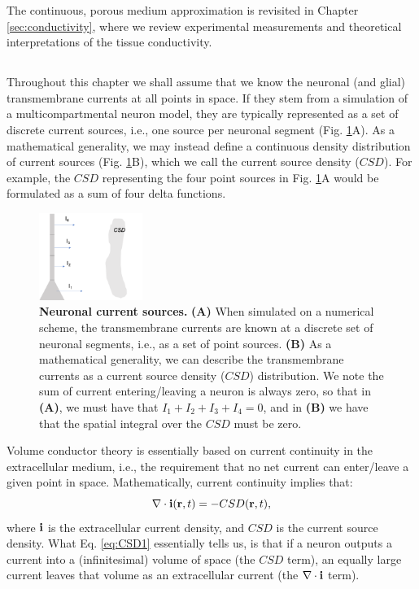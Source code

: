 The continuous, porous medium approximation is revisited in Chapter \ref{sec:conductivity}, where we review experimental measurements and theoretical interpretations of the tissue conductivity.


\subsection{}
\label{sec:continuous}
Throughout this chapter we shall assume that we know the neuronal (and glial) transmembrane currents at all points in space. If they stem from a simulation of a multicompartmental neuron model, they are typically represented as a set of discrete current sources, i.e., one source per neuronal segment (Fig. \ref{VC:fig:CSD}A). As a mathematical generality, we may instead define a continuous density distribution of current sources (Fig. \ref{VC:fig:CSD}B), which we call the current source density ($CSD$). For example, the $CSD$ representing the four point sources in Fig. \ref{VC:fig:CSD}A would be formulated as a sum of four delta functions. 

\begin{figure}[!ht]
\begin{center}
\includegraphics[width=0.3\textwidth]{Figures/VC/CSD.png}
\end{center}
\caption{\textbf{Neuronal current sources.}  {\bf (A)} When simulated on a numerical scheme, the transmembrane currents are known at a discrete set of neuronal segments, i.e., as a set of point sources.  {\bf (B)} As a mathematical generality, we can describe the transmembrane currents as a current source density ($CSD$) distribution. We note the sum of current entering/leaving a neuron is always zero, so that in {\bf (A)}, we must have that $I_1 + I_2 + I_3 + I_4 = 0$, and in {\bf (B)} we have that the spatial integral over the $CSD$ must be zero.
}
\label{VC:fig:CSD}
\end{figure}
Volume conductor theory is essentially based on current continuity in the extracellular medium, i.e., the requirement that no net current can enter/leave a given point in space. Mathematically, current continuity implies that:
\begin{equation}
\nabla \cdot {\bf i}({\bf r}, t) = - CSD({\bf r}, t),
\label{eq:CSD1}
\end{equation}
where ${\bf i}$ is the extracellular current density, and $CSD$ is the current source density. What Eq. \ref{eq:CSD1} essentially tells us, is that if a neuron outputs a current into a (infinitesimal) volume of space (the $CSD$ term), an equally large current leaves that volume as an extracellular current (the $\nabla \cdot {\bf i}$ term).

